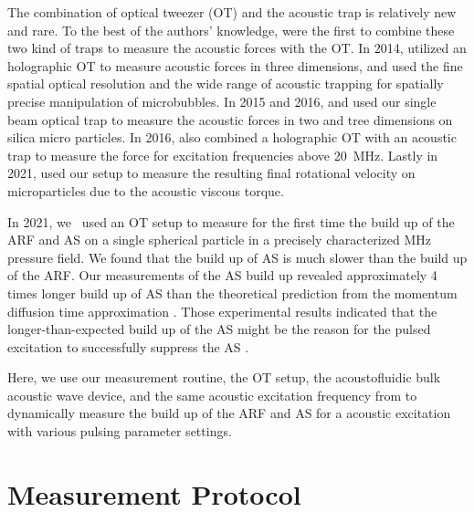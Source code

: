 The combination of optical tweezer (OT) and the acoustic trap is relatively new 
and rare. To the best of the authors' knowledge,  were 
\citeyear{Thalhammer2011} the first to combine these two kind of traps to 
measure the acoustic forces with the OT. In 2014,  
utilized an holographic OT to measure acoustic forces in three dimensions, and 
 used the fine spatial optical resolution and the wide range of 
acoustic trapping for spatially precise manipulation of microbubbles. In 2015 
and 2016,  and  used our single beam 
optical trap to measure the acoustic forces in two and tree dimensions on 
silica micro particles. In 2016,  also combined a 
holographic OT with an acoustic trap to measure the force for excitation 
frequencies above \SI{20}{\mega\hertz}. Lastly in 2021,  
used our setup to measure the resulting final rotational velocity on 
microparticles due to the acoustic viscous torque.

In 2021, we~\cite{Goering2021} used an OT setup to measure for the first time 
the build up of the ARF and AS on a single spherical particle in a precisely 
characterized \si{\mega\hertz} pressure field. We found that the build up of AS 
is much slower than the build up of the ARF. Our measurements of the AS build 
up revealed approximately 4 times longer build up of AS than the theoretical 
prediction from the momentum diffusion time approximation 
\cite{Muller2015,Goering2021}. Those experimental results indicated that the 
longer-than-expected build up of the AS might be the reason for the pulsed 
excitation to successfully suppress the AS \cite{Hoyos2013,Castro2016}.



Here, we use our measurement routine, the OT setup, the acoustofluidic bulk 
acoustic wave device, and the same acoustic excitation frequency from 
\cite{Goering2021} to dynamically measure the build up of the ARF and AS for a 
acoustic excitation with various pulsing parameter settings.

\section{Measurement Protocol}

